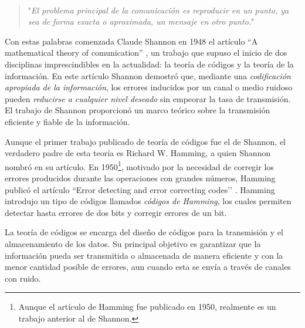 %

\paragraph{}
\phantom{}

\begin{quote}
    "\textit{El problema principal de la comunicación es reproducir en un punto, ya sea de forma exacta o aproximada, un mensaje en otro punto.}"
\end{quote}

Con estas palabras comenzada Claude Shannon en 1948 el artículo ``A mathematical theory of comunication'' \cite{Shanon}, un trabajo que supuso el inicio de dos disciplinas imprescindibles en la actualidad: la teoría de códigos y la teoría de la información. En este artículo Shannon demostró que, mediante una \emph{codificación apropiada de la información}, los errores inducidos por un canal o medio ruidoso pueden \emph{reducirse a cualquier nivel deseado} sin empeorar la tasa de transmisión. El trabajo de Shannon proporcionó un marco teórico sobre la transmisión eficiente y fiable de la información.

Aunque el primer trabajo publicado de teoría de códigos fue el de Shannon, el verdadero padre de esta teoría es Richard W. Hamming, a quien Shannon nombró en su artículo. En 1950\footnote{Aunque el artículo de Hamming fue publicado en 1950, realmente es un trabajo anterior al de Shannon.}, motivado por la necesidad de corregir los errores producidos durante las operaciones con grandes números, Hamming publicó el artículo ``Error detecting and error correcting codes’’ \cite{Hamming}. Hamming introdujo un tipo de códigos llamados \emph{códigos de Hamming}, los cuales permiten detectar hasta errores de dos bits y corregir errores de un bit.

La teoría de códigos se encarga del diseño de códigos para la transmisión y el almacenamiento de los datos. Su principal objetivo es garantizar que la información pueda ser transmitida o almacenada de manera eficiente y con la menor cantidad posible de errores, aun cuando esta se envía a través de canales con ruido.

